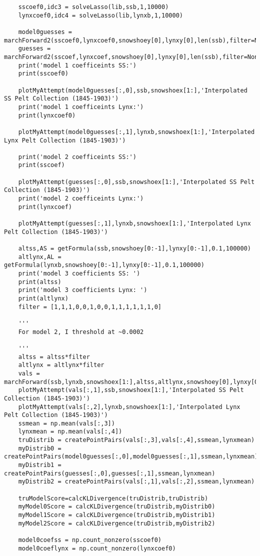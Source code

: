 \documentclass[12pt]{article}
\begin{document}
\begin{verbatim}
	sscoef0,idc3 = solveLasso(lib,ssb,1,10000)
	lynxcoef0,idc4 = solveLasso(lib,lynxb,1,10000)
	
	model0guesses = marchForward2(sscoef0,lynxcoef0,snowshoey[0],lynxy[0],len(ssb),filter=None)
	guesses = marchForward2(sscoef,lynxcoef,snowshoey[0],lynxy[0],len(ssb),filter=None)
	print('model 1 coefficeints SS:')
	print(sscoef0)
	
	plotMyAttempt(model0guesses[:,0],ssb,snowshoex[1:],'Interpolated SS Pelt Collection (1845-1903)')
	print('model 1 coefficeints Lynx:')
	print(lynxcoef0)
	
	plotMyAttempt(model0guesses[:,1],lynxb,snowshoex[1:],'Interpolated Lynx Pelt Collection (1845-1903)')
	
	print('model 2 coefficeints SS:')
	print(sscoef)
	
	plotMyAttempt(guesses[:,0],ssb,snowshoex[1:],'Interpolated SS Pelt Collection (1845-1903)')
	print('model 2 coefficeints Lynx:')
	print(lynxcoef)
	
	plotMyAttempt(guesses[:,1],lynxb,snowshoex[1:],'Interpolated Lynx Pelt Collection (1845-1903)')
	
	altss,AS = getFormula(ssb,snowshoey[0:-1],lynxy[0:-1],0.1,100000)
	altlynx,AL = getFormula(lynxb,snowshoey[0:-1],lynxy[0:-1],0.1,100000)
	print('model 3 coefficients SS: ')
	print(altss)
	print('model 3 coefficients Lynx: ')
	print(altlynx)
	filter = [1,1,1,0,0,1,0,0,1,1,1,1,1,1,0]
	
	'''
	For model 2, I threshold at ~0.0002
	
	'''
	altss = altss*filter
	altlynx = altlynx*filter
	vals = marchForward(ssb,lynxb,snowshoex[1:],altss,altlynx,snowshoey[0],lynxy[0])
	plotMyAttempt(vals[:,1],ssb,snowshoex[1:],'Interpolated SS Pelt Collection (1845-1903)')
	plotMyAttempt(vals[:,2],lynxb,snowshoex[1:],'Interpolated Lynx Pelt Collection (1845-1903)')
	ssmean = np.mean(vals[:,3])
	lynxmean = np.mean(vals[:,4])
	truDistrib = createPointPairs(vals[:,3],vals[:,4],ssmean,lynxmean)
	myDistrib0 = createPointPairs(model0guesses[:,0],model0guesses[:,1],ssmean,lynxmean)
	myDistrib1 = createPointPairs(guesses[:,0],guesses[:,1],ssmean,lynxmean)
	myDistrib2 = createPointPairs(vals[:,1],vals[:,2],ssmean,lynxmean)
	
	truModelScore=calcKLDivergence(truDistrib,truDistrib)
	myModel0Score = calcKLDivergence(truDistrib,myDistrib0)
	myModel1Score = calcKLDivergence(truDistrib,myDistrib1)
	myModel2Score = calcKLDivergence(truDistrib,myDistrib2)
	
	model0coefss = np.count_nonzero(sscoef0)
	model0coeflynx = np.count_nonzero(lynxcoef0)
	

\end{verbatim}
\end{document}
